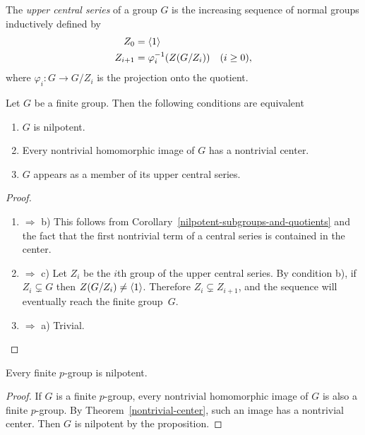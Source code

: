 \begin{defn}
    The \textsl{upper central series} of a group $G$ is the increasing sequence of normal groups inductively defined by
    \begin{align*}
        Z_0 &=\langle1\rangle\\
        Z_{i+1} &=\varphi_i^{-1}(Z(G/Z_i))\quad(i\ge0),
    \end{align*}
    where $\varphi_i\colon G\to G/Z_i$ is the projection onto the quotient.
\end{defn}

\begin{prop}\label{nilpotent-center-series}
    Let $G$ be a finite group. Then the following conditions are equivalent
    \begin{enumerate}[\upshape a)]
    \item $G$ is nilpotent.
    \item Every nontrivial homomorphic image of\/ $G$ has a nontrivial center.
    \item $G$ appears as a member of its upper central series.
    \end{enumerate}
\end{prop}

\begin{proof}${}$
\begin{enumerate}[\upshape a)]
    \item $\Rightarrow$ b) This follows from Corollary~\ref{nilpotent-subgroups-and-quotients} and the fact that the first nontrivial term of a central series is contained in the center.
    \item $\Rightarrow$ c) Let $Z_i$ be the $i$th group of the upper central series. By condition b), if $Z_i\varsubsetneq G$ then $Z(G/Z_i)\ne\langle1\rangle$. Therefore $Z_i\varsubsetneq Z_{i+1}$, and the sequence will eventually reach the finite group~$G$.
    \item $\Rightarrow$ a) Trivial.
\end{enumerate}
\end{proof}


\begin{cor}\label{p-groups-are-nilpotent}
    Every finite $p$-group is nilpotent.
\end{cor}

\begin{proof} If $G$ is a finite $p$-group, every nontrivial homomorphic image of $G$ is also a finite $p$-group. By Theorem~\ref{nontrivial-center}, such an image has a nontrivial center. Then $G$ is nilpotent by the proposition.  \end{proof}

